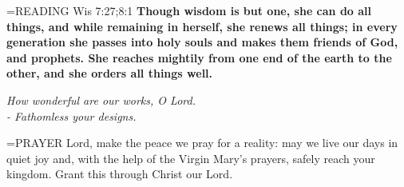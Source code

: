 \hangindent=\parindent \small{READING} Wis 7:27;8:1 \textbf{Though wisdom is but one, she can do all things, and while remaining in herself, she renews all things; in every generation she passes into holy souls and makes them friends of God, and prophets. She reaches mightily from one end of the earth to the other, and she orders all things well.}

\begin{center}
\textit{How wonderful are our works, O Lord.\\
- Fathomless your designs.}
\end{center}

\hangindent=\parindent \small{PRAYER  Lord, make the peace we pray for a reality: may we live our days in quiet joy and, with the help of the Virgin Mary’s prayers, safely reach your kingdom. Grant this through Christ our Lord.}
